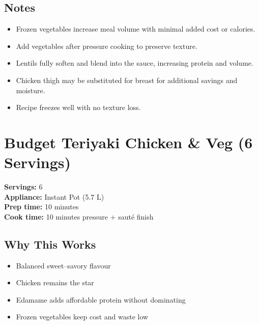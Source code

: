 \documentclass[11pt,a4paper]{article}
\begin{document}
\vspace{0.5em}

\subsection*{Notes}
\begin{itemize}
    \item Frozen vegetables increase meal volume with minimal added cost or calories.
    \item Add vegetables after pressure cooking to preserve texture.
    \item Lentils fully soften and blend into the sauce, increasing protein and volume.
    \item Chicken thigh may be substituted for breast for additional savings and moisture.
    \item Recipe freezes well with no texture loss.
\end{itemize}

\section*{Budget Teriyaki Chicken \& Veg (6 Servings)}

\textbf{Servings:} 6 \\
\textbf{Appliance:} Instant Pot (5.7 L) \\
\textbf{Prep time:} 10 minutes \\
\textbf{Cook time:} 10 minutes pressure + sauté finish

\vspace{0.5em}

\subsection*{Why This Works}
\begin{itemize}
    \item Balanced sweet--savory flavour
    \item Chicken remains the star
    \item Edamame adds affordable protein without dominating
    \item Frozen vegetables keep cost and waste low
\end{itemize}

\vspace{0.5em}
\end{document}
